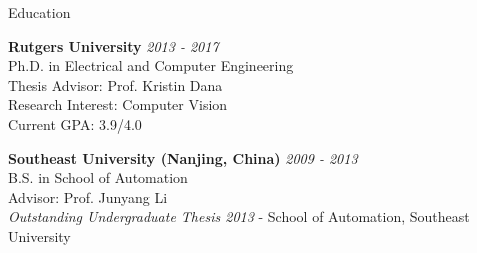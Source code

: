 \documentclass{resume} %
\begin{document}
\begin{rSection}{Education}

{\bf Rutgers University} \hfill {\em 2013 - 2017} \\
Ph.D. in Electrical and Computer Engineering \\
Thesis Advisor: Prof. Kristin Dana \\
Research Interest: Computer Vision\\
Current GPA: 3.9/4.0

{\bf Southeast University (Nanjing, China)} \hfill {\em 2009 - 2013} \\
B.S. in School of Automation \\
Advisor: Prof. Junyang Li \\
 {\it Outstanding Undergraduate Thesis 2013} - School of Automation, Southeast University%
\end{rSection}






\end{document}
